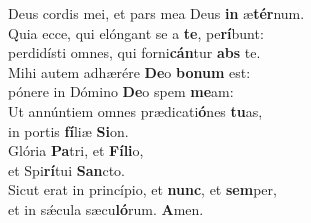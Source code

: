 \oddverse Deus cordis mei, et pars mea Deus \textbf{in} æ\textbf{tér}num.\\
\evenverse Quia ecce, qui elóngant se a \textbf{te}, pe\textbf{rí}bunt:~\*\\
\evenverse perdidísti omnes, qui forni\textbf{cán}tur \textbf{abs} te.\\
\oddverse Mihi autem adhærére \textbf{De}o \textbf{bo}\textbf{num} est:~\*\\
\oddverse pónere in Dómino \textbf{De}o spem \textbf{me}am:\\
\evenverse Ut annúntiem omnes prædicati\textbf{ó}nes \textbf{tu}as,~\*\\
\evenverse in portis \textbf{fí}liæ \textbf{Si}on.\\
\oddverse Glória \textbf{Pa}tri, et \textbf{Fí}\textbf{li}o,~\*\\
\oddverse et Spi\textbf{rí}tui \textbf{San}cto.\\
\evenverse Sicut erat in princípio, et \textbf{nunc}, et \textbf{sem}per,~\*\\
\evenverse et in sǽcula sæcu\textbf{ló}rum. \textbf{A}men.\\

